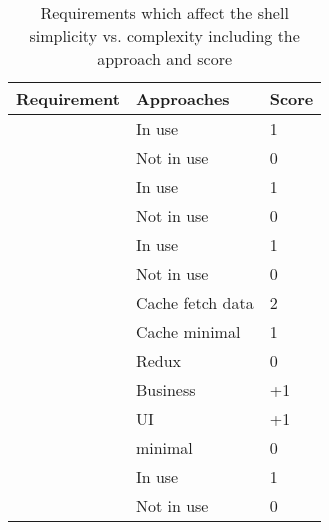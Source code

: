 \begin{table}[h]
      \centering
      \begin{tabular}{|l|l|l|}
            \hline
            \textbf{Requirement} &
            \textbf{Approaches}  &
            \textbf{Score}
            \\ \hline
            \multirow{2}{*}{\nameref{cha:requirement_detail_integration_pagelayout}}
                                 & In use           & 1  \\ \cline{2-3}
                                 & Not in use       & 0  \\ \hline
            \multirow{2}{*}{\nameref{cha:requirement_detail_integration_widget}}
                                 & In use           & 1  \\ \cline{2-3}
                                 & Not in use       & 0  \\ \hline
            \multirow{2}{*}{\nameref{cha:requirement_detail_integration_abstraction}}
                                 & In use           & 1  \\ \cline{2-3}
                                 & Not in use       & 0  \\ \hline
            \multirow{3}{*}{\nameref{cha:requirement_detail_state_exchange}}
                                 & Cache fetch data & 2  \\ \cline{2-3}
                                 & Cache minimal    & 1  \\ \cline{2-3}
                                 & Redux            & 0  \\ \hline
            \multirow{3}{*}{\nameref{cha:requirement_detail_integration_sharedlogic}}
                                 & Business         & +1 \\ \cline{2-3}
                                 & \ac{UI}          & +1 \\ \cline{2-3}
                                 & minimal          & 0  \\ \hline
            \multirow{2}{*}{\nameref{cha:requirement_detail_integration_lifecycle}}
                                 & In use           & 1  \\ \cline{2-3}
                                 & Not in use       & 0  \\ \hline
      \end{tabular}
      \caption{Requirements which affect the shell simplicity vs. complexity including the approach and score}
      \label{tbl:shell_assessment}
\end{table}

